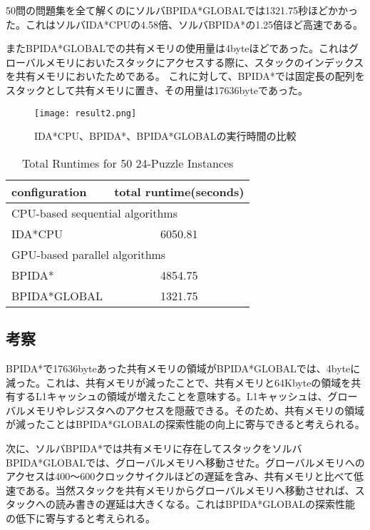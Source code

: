 \documentclass[a4paper,11pt,oneside,openany]{jsbook}
\begin{document}
50問の問題集を全て解くのにソルバBPIDA*GLOBALでは1321.75秒ほどかかった。これはソルバIDA*CPUの4.58倍、ソルバBPIDA*の1.25倍ほど高速である。

またBPIDA*GLOBALでの共有メモリの使用量は4byteほどであった。これはグローバルメモリにおいたスタックにアクセスする際に、スタックのインデックスを共有メモリにおいたためである。
これに対して、BPIDA*では固定長の配列をスタックとして共有メモリに置き、その用量は17636byteであった。

\begin{figure}[H]
\begin{center}
\texttt{[image: result2.png]}
\caption{IDA*CPU、BPIDA*、BPIDA*GLOBALの実行時間の比較}
\end{center}
\end{figure}

\begin{table}[H]
\centering
\caption{Total Runtimes for 50 24-Puzzle Instances}
\label{my-label}
\begin{tabular}{|l|c|}
\hline
configuration & \multicolumn{1}{l|}{total runtime(seconds)} \\ \hline
\multicolumn{2}{|l|}{CPU-based sequential algorithms} \\ \hline
IDA*CPU & 6050.81 \\ \hline
\multicolumn{2}{|l|}{GPU-based parallel algorithms} \\ \hline
BPIDA* & 4854.75 \\
BPIDA*GLOBAL & 1321.75 \\  \hline
\end{tabular}
\end{table}


\subsection{考察}
BPIDA*で17636byteあった共有メモリの領域がBPIDA*GLOBALでは、4byteに減った。これは、共有メモリが減ったことで、共有メモリと64Kbyteの領域を共有するL1キャッシュの領域が増えたことを意味する。L1キャッシュは、グローバルメモリやレジスタへのアクセスを隠蔽できる。そのため、共有メモリの領域が減ったことはBPIDA*GLOBALの探索性能の向上に寄与できると考えられる。

次に、ソルバBPIDA*では共有メモリに存在してスタックをソルバBPIDA*GLOBALでは、グローバルメモリへ移動させた。グローバルメモリへのアクセスは400～600クロックサイクルほどの遅延を含み、共有メモリと比べて低速である。当然スタックを共有メモリからグローバルメモリへ移動させれば、スタックへの読み書きの遅延は大きくなる。これはBPIDA*GLOBALの探索性能の低下に寄与すると考えられる。
\end{document}

